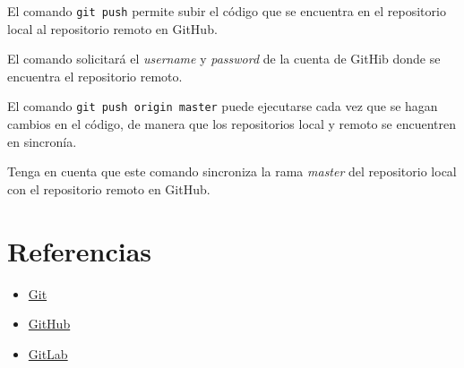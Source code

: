 El comando \texttt{git\ push} permite subir el código que se encuentra
en el repositorio local al repositorio remoto en GitHub.

\begin{Shaded}
\begin{Highlighting}[]
    \ExtensionTok{$}
\end{Highlighting}
\end{Shaded}

El comando solicitará el \emph{username} y \emph{password} de la cuenta
de GitHib donde se encuentra el repositorio remoto.

El comando \texttt{git\ push\ origin\ master} puede ejecutarse cada vez
que se hagan cambios en el código, de manera que los repositorios local
y remoto se encuentren en sincronía.

Tenga en cuenta que este comando sincroniza la rama \emph{master} del
repositorio local con el repositorio remoto en GitHub.

\section{Referencias}

\begin{itemize}
\item
  \href{https://git-scm.com/}{Git}
\item
  \href{https://github.com/}{GitHub}
\item
  \href{https://gitlab.com/}{GitLab}
\end{itemize}
